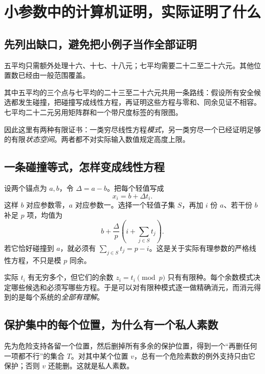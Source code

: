 \chapter{小参数中的计算机证明，实际证明了什么}\label{app:small}
\section{先列出缺口，避免把小例子当作全部证明}
五平均只需额外处理十六、十七、十八元；七平均需要二十二至二十六元。其他位置数已经由一般范围覆盖。

其中五平均的三个点与七平均的二十三至二十六元共用一条路线：假设所有安全候选都发生碰撞，把碰撞写成线性方程，再证明这些方程与零和、同余见证不相容。七平均二十二元另用矩阵群和一个带尺度标签的有限图。

因此这里有两种有限证书：一类穷尽线性方程\emph{模式}，另一类穷尽一个已经证明足够的有限\emph{状态空间}。两者都不对实际输入数值规定高度上限。

\section{一条碰撞等式，怎样变成线性方程}
设两个锚点为 $a,b$，令 $\Delta=a-b$。把每个轻值写成
\[x_i=b+\Delta t_i.
\]
这样 $b$ 对应参数零，$a$ 对应参数一。选择一个轻值子集 $S$，再加 $i$ 份 $a$、若干份 $b$ 补足 $p$ 项，均值为
\[b+\frac{\Delta}{p}\left(i+\sum_{j\in S}t_j\right).
\]
若它恰好碰撞到 $a$，就必须有 $\sum_{j\in S}t_j=p-i$。这是关于实际有理参数的严格线性方程，不只是模 $p$ 同余。

实际 $t_i$ 有无穷多个，但它们的余数 $z_i=t_i\pmod p$ 只有有限种。每个余数模式决定哪些候选和必须写哪些方程。于是可以对有限种模式逐一做精确消元，而消元得到的是每个系统的\emph{全部有理解}。

\section{保护集中的每个位置，为什么有一个私人素数}
先为危险支持各留一个位置，然后删掉所有多余的保护位置，得到一个“再删任何一项都不行”的集合 $T$。对其中某个位置 $v$，总有一个危险素数的例外支持只由它保护；否则 $v$ 还能删。这就是私人素数。

